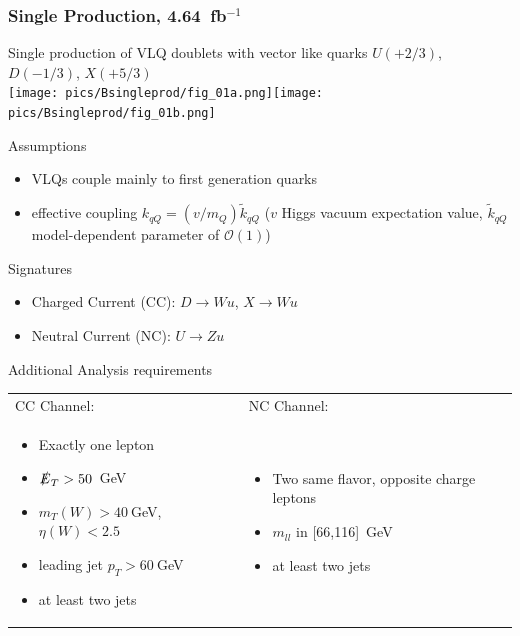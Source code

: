 \documentclass[xcolor=dvipsnames,10pt]{beamer}
\newcommand{\ifb}{~fb$^{-1}$}
\begin{document}
\begin{frame}\frametitle{Single Production, 4.64\ifb~\cite{ATLAS-CONF-2012-137}} %
\footnotesize\centering

\begin{minipage}{.4\textwidth}
\centering
\alert{Single production} of VLQ doublets with vector like quarks $U(+2/3)$, $D(-1/3)$, $X(+5/3)$\\
\texttt{[image: pics/Bsingleprod/fig\_01a.png]}\texttt{[image: pics/Bsingleprod/fig\_01b.png]}
\scriptsize

Assumptions
\begin{itemize}
\item VLQs couple mainly to \alert{first generation} quarks
\item \alert{effective coupling} $k_{qQ} = (v/m_Q)\tilde{k}_{qQ}$ ($v$ Higgs vacuum expectation value, $\tilde{k}_{qQ}$ model-dependent parameter of $\mathcal{O}(1)$)
\end{itemize}

Signatures
\begin{itemize}
\item \alert{Charged Current (CC)}: $D\rightarrow Wu$, $X\rightarrow Wu$
\item \alert{Neutral Current (NC)}: $U\rightarrow Zu$
\end{itemize}

\end{minipage}\begin{minipage}{.6\textwidth}
\centering

Additional Analysis requirements

\renewcommand{\tabcolsep}{-0.1cm}
{\scriptsize
\begin{tabular}{p{}p{}}
CC Channel: & NC Channel: \\
\begin{itemize}
\item Exactly \alert{one} lepton
\item $\slashed{E}_T>50$~GeV
\item $m_T(W)>40~$GeV, $\eta(W)<2.5$
\item leading jet $p_T>60~$GeV
\item at least two jets
\end{itemize} & 
\begin{itemize}
\item Two same flavor, \alert{opposite charge} leptons
\item $m_{ll}$ in [66,116]~GeV
\item at least two jets
\end{itemize} \\
\end{tabular}
}



\end{minipage}
\end{frame}
\end{document}
